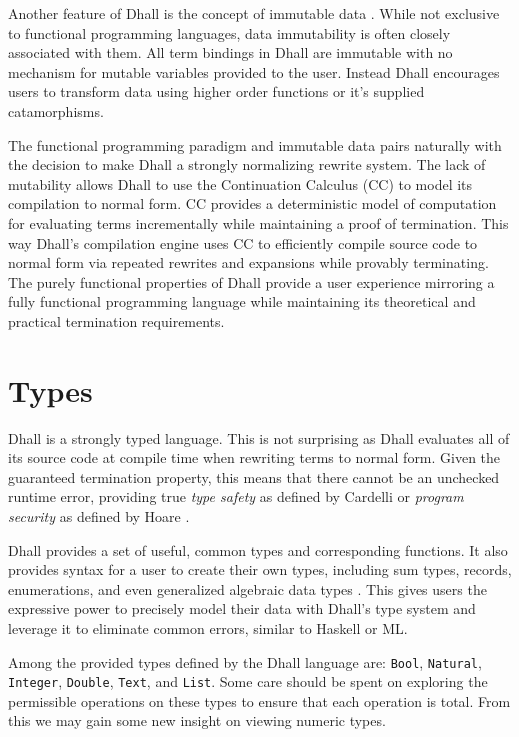 \documentclass[12pt]{diazessay}
\newcommand{\Bool   }{\texttt{Bool}}
\newcommand{\Nat    }{\texttt{Natural}}
\newcommand{\Integer}{\texttt{Integer}}
\newcommand{\Double }{\texttt{Double}}
\newcommand{\List   }{\texttt{List}}
\begin{document}
Another feature of Dhall is the concept of immutable data \cite{driscoll1989making}.
While not exclusive to functional programming languages, data immutability is often closely associated with them.
All term bindings in Dhall are immutable with no mechanism for mutable variables provided to the user.
Instead Dhall encourages users to transform data using higher order functions or it's supplied catamorphisms.

The functional programming paradigm and immutable data pairs naturally with the decision to make Dhall a strongly normalizing rewrite system.
The lack of mutability allows Dhall to use the Continuation Calculus \cite{geron2013continuation} (CC) to model its compilation to normal form.
CC provides a deterministic model of computation for evaluating terms incrementally while maintaining a proof of termination.
This way Dhall's compilation engine uses CC to efficiently compile source code to normal form via repeated rewrites and expansions while provably terminating.
The purely functional properties of Dhall provide a user experience mirroring a fully functional programming language while maintaining its theoretical and practical termination requirements.

\section*{Types}

Dhall is a strongly typed language.
This is not surprising as Dhall evaluates all of its source code at compile time when rewriting terms to normal form.
Given the guaranteed termination property, this means that there cannot be an unchecked runtime error, providing true \emph{type safety} as defined by Cardelli \cite{cardelli1989typeful} or \emph{program security} as defined by Hoare \cite{hoare1973hints}.

Dhall provides a set of useful, common types and corresponding functions.
It also provides syntax for a user to create their own types, including sum types, records, enumerations, and even generalized algebraic data types \cite{cheney2003first}.
This gives users the expressive power to precisely model their data with Dhall's type system and leverage it to eliminate common errors, similar to Haskell or ML.

Among the provided types defined by the Dhall language are: \Bool{}, \Nat{}, \Integer{}, \Double{}, \texttt{Text}, and \List{}.
Some care should be spent on exploring the permissible operations on these types to ensure that each operation is total.
From this we may gain some new insight on viewing numeric types.
\end{document}
